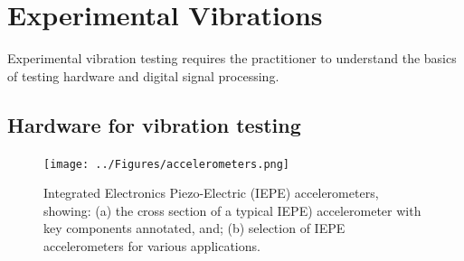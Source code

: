 \documentclass[12pt,letter]{article}
\numberwithin{ex}{section} %
\numberwithin{re}{section} %
\begin{document}
	
	\setcounter{section}{7}	
	\setcounter{figure}{0}   
	\renewcommand\thefigure{\thesection.\arabic{figure}}
	\setcounter{equation}{0}   
	\renewcommand\theequation{\thesection.\arabic{equation}}

	\section{Experimental Vibrations}
	
Experimental vibration testing requires the practitioner to understand the basics of testing hardware and digital signal processing.

\subsection{Hardware for vibration testing}


\begin{figure}[H]
    \centering
    \texttt{[image: ../Figures/accelerometers.png]}
    \caption{Integrated Electronics Piezo-Electric (IEPE) accelerometers, showing: (a) the cross section of a typical IEPE) accelerometer with key components annotated, and; (b) selection of IEPE accelerometers for various applications.}
    \label{fig:accelerometers}
\end{figure} 








\begin{table}[H]
\caption{Parameters for various IEPE accelerometers.}
\end{table}
\end{document}
